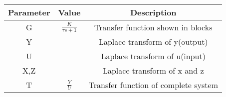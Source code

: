 \begin{tabular}{|c|c|c|}
\hline
Parameter & Value & Description \\
\hline 
G & $\frac{K}{\tau s+1}$ &Transfer function shown in blocks\\
\hline
Y & &Laplace transform of y(output)\\
\hline
U & &Laplace transform of u(input)\\
\hline
X,Z & &Laplace transform of x and z\\
\hline
T & $\frac{Y}{U}$ &Transfer function of complete system \\
\hline
\end{tabular}
